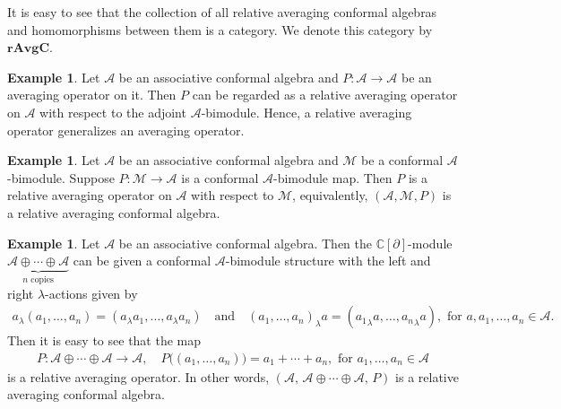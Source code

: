 \documentclass[a4paper,reqno,10pt]{amsart}
\theoremstyle{plain}
\theoremstyle{definition}
\newtheorem{exam}[thm]{Example}
\theoremstyle{remark}
\newcommand{\C}{\mathbb{C}}
\newcommand{\M}{\mathcal{M}}
\newcommand{\p}{\partial}
\newcommand{\la}{\lambda}
\begin{document}
It is easy to see that the collection of all relative averaging conformal algebras and homomorphisms between them is a category. We denote this category by ${\mathbf{rAvgC}}$.


\begin{exam}
Let $\mathcal{A}$ be an associative conformal algebra and $P: \mathcal{A} \to \mathcal{A}$ be an averaging operator on it. Then $P$ can be regarded as a relative averaging operator on $\mathcal{A}$ with respect to the adjoint $\mathcal{A}$-bimodule. Hence, a relative averaging operator generalizes an averaging operator.
\end{exam}

\begin{exam}
Let $\mathcal{A}$ be an associative conformal algebra and $\mathcal{M}$ be a conformal $\mathcal{A}$-bimodule. Suppose $P:\mathcal{M} \rightarrow \mathcal{A}$ is a conformal $\mathcal{A}$-bimodule map. Then $P$ is a relative averaging operator on $\mathcal{A}$ with respect to $\M$, equivalently, $(\mathcal{A},\mathcal{M}, P)$ is a relative averaging conformal algebra.
\end{exam}

 \begin{exam}
     Let $\mathcal{A}$ be an associative conformal algebra. Then the $\C[\p]$-module $\underbrace{\mathcal{A}\oplus\cdots\oplus\mathcal{A}}_{n\text{ copies}}$ can be given a conformal $\mathcal{A}$-bimodule structure with the left and right $\la$-actions given by
     \begin{align*}
         a_{\la}(a_1, \ldots, a_n ) = (a_{\la}a_1, \ldots , a_{\la}a_{n}) ~~~  \text{ and } ~~~ (a_1, \ldots , a_{n})_{\la}a = ({a_1}_{\la}a, \ldots , {a_{n}}_{\la}a ), \text{ for } a, a_1, \ldots , a_n \in \mathcal{A}.
     \end{align*}
     Then it is easy to see that the map
     \begin{align*}
         P : \mathcal{A} \oplus \cdots \oplus \mathcal{A} \longrightarrow \mathcal{A}, \quad P\big( (a_1, \ldots, a_n) \big) = a_1 + \cdots + a_n, \text{ for }  a_1, \ldots , a_n \in \mathcal{A}
     \end{align*}
     is a relative averaging operator. In other words, $(\mathcal{A},\, \mathcal{A} \oplus \cdots \oplus \mathcal{A},\,P)$ is a relative averaging conformal algebra.
 \end{exam}
\end{document}
